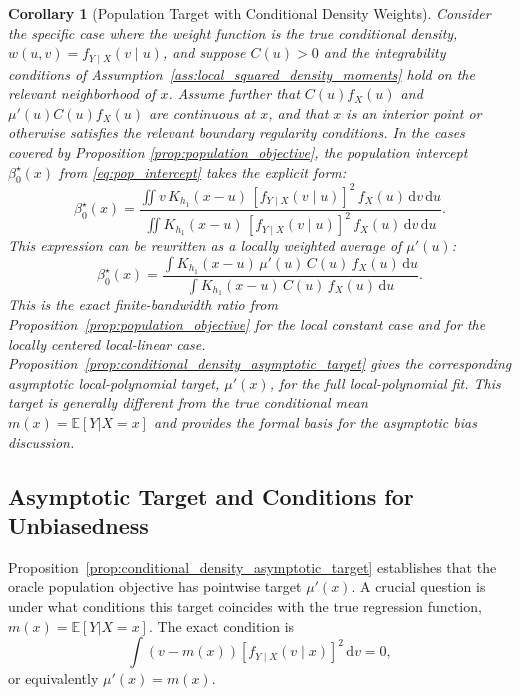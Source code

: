 \documentclass[preprint,1p,times,authoryear]{elsarticle}
\newtheorem{corollary}{Corollary}
\begin{document}
\begin{corollary}[Population Target with Conditional Density Weights]
\label{cor:population_target}
Consider the specific case where the weight function is the true conditional density, $w(u,v) = f_{Y\mid X}(v\mid u)$, and suppose \(C(u)>0\) and the integrability conditions of Assumption~\ref{ass:local_squared_density_moments} hold on the relevant neighborhood of \(x\).
Assume further that \(C(u)f_X(u)\) and \(\mu'(u)C(u)f_X(u)\) are continuous at \(x\), and that \(x\) is an interior point or otherwise satisfies the relevant boundary regularity conditions. In the cases covered by Proposition \ref{prop:population_objective}, the population intercept $\beta_0^\star(x)$ from \eqref{eq:pop_intercept} takes the explicit form:
\[
\beta_0^\star(x) = \frac{\iint v\,K_{h_1}(x-u)\,[f_{Y\mid X}(v\mid u)]^2\,f_X(u)\,\mathrm d v\,\mathrm d u}{\iint K_{h_1}(x-u)\,[f_{Y\mid X}(v\mid u)]^2\,f_X(u)\,\mathrm d v\,\mathrm d u}.
\]
This expression can be rewritten as a locally weighted average of $\mu'(u)$:
\[
\beta_0^\star(x) = \frac{\int K_{h_1}(x-u)\,\mu'(u)\,C(u)\,f_X(u)\,\mathrm d u}{\int K_{h_1}(x-u)\,C(u)\,f_X(u)\,\mathrm d u}.
\]
This is the exact finite-bandwidth ratio from Proposition~\ref{prop:population_objective} for the local constant case and for the locally centered local-linear case. Proposition~\ref{prop:conditional_density_asymptotic_target} gives the corresponding asymptotic local-polynomial target, \(\mu'(x)\), for the full local-polynomial fit. This target is generally different from the true conditional mean $m(x) = \mathbb{E}[Y|X=x]$ and provides the formal basis for the asymptotic bias discussion.
\end{corollary}

\subsection{Asymptotic Target and Conditions for Unbiasedness}
Proposition~\ref{prop:conditional_density_asymptotic_target} establishes that the oracle population objective has pointwise target $\mu'(x)$. A crucial question is under what conditions this target coincides with the true regression function, $m(x) = \mathbb{E}[Y|X=x]$. The exact condition is
\[
\int (v-m(x))[f_{Y\mid X}(v\mid x)]^2\,\mathrm d v=0,
\]
or equivalently $\mu'(x)=m(x)$.
\end{document}
